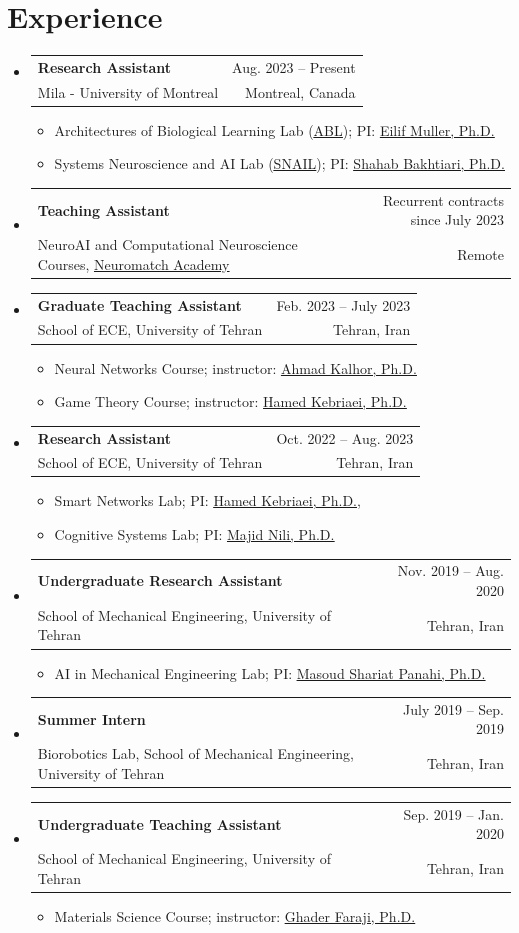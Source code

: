 \documentclass[A4,11pt]{article}
\makeatletter
\newcommand{\CVItem}[1]{
  \item\small{
    {#1 \vspace{-2pt}}
  }
}
\newcommand{\CVSubheading}[4]{
  \vspace{-2pt}\item
    \begin{tabular*}{0.97\textwidth}[t]{l@{\extracolsep{\fill}}r}
      \textbf{#1} & #2 \\
      \small#3 & \small #4 \\
    \end{tabular*}\vspace{-7pt}
}
\newcommand{\CVSubHeadingListStart}{\begin{itemize}[leftmargin=0.5cm, label={}]}
\newcommand{\CVSubHeadingListEnd}{\end{itemize}}
\newcommand{\CVItemListStart}{\begin{itemize}}
\newcommand{\CVItemListEnd}{\end{itemize}\vspace{-5pt}}
\makeatother
\begin{document}
\section{Experience}
  \CVSubHeadingListStart
    \CVSubheading
  {Research Assistant}{Aug. 2023 -- Present}
  {Mila - University of Montreal}{Montreal, Canada}
  \CVItemListStart
   \CVItem{Architectures of Biological Learning Lab (\href{https://neuro.plasticit.ai/}{\underline{ABL}}); PI: \href{https://scholar.google.ch/citations?hl=en&user=r4-NZhwAAAAJ&view_op=list_works&sortby=pubdate}{\underline{Eilif Muller, Ph.D.}}}
  \CVItem{Systems Neuroscience and AI Lab (\href{https://www.snailab.ca/}{\underline{SNAIL}}); PI: \href{https://scholar.google.com/citations?user=f_JDOhEAAAAJ&hl=en}{\underline{Shahab Bakhtiari, Ph.D.}}}
  \CVItemListEnd

  \CVSubheading
      {Teaching Assistant}{Recurrent contracts since July 2023}
      {NeuroAI and Computational Neuroscience Courses, \href{https://academy.neuromatch.io}{\underline{Neuromatch Academy}}}{Remote}
   \CVSubheading
      {Graduate Teaching Assistant}{Feb. 2023 -- July 2023}
      {School of ECE, University of Tehran}{Tehran, Iran}
      \CVItemListStart
        \CVItem{Neural Networks Course; instructor: \href{https://scholar.google.com/citations?user=m7xdmMgAAAAJ&hl=en}{\underline{Ahmad Kalhor, Ph.D.}}}
        \CVItem{Game Theory Course; instructor: \href{https://scholar.google.com/citations?user=eDseLNYAAAAJ&hl=en}{\underline{Hamed Kebriaei, Ph.D.}}}
      \CVItemListEnd
  \CVSubheading
      {Research Assistant}{Oct. 2022 -- Aug. 2023}
      {School of ECE, University of Tehran}{Tehran, Iran}
      \CVItemListStart
        \CVItem{Smart Networks Lab; PI: \href{https://scholar.google.com/citations?user=eDseLNYAAAAJ&hl=en}{\underline{Hamed Kebriaei, Ph.D.}},}
        \CVItem{Cognitive Systems Lab; PI: \href{https://scholar.google.com/citations?user=QlwWxmoAAAAJ&hl=en}{\underline{Majid Nili, Ph.D.}}}
      \CVItemListEnd
    \CVSubheading
      {Undergraduate Research Assistant}{Nov. 2019 -- Aug. 2020}
      {School of Mechanical Engineering, University of Tehran}{Tehran, Iran}
      \CVItemListStart
        \CVItem{AI in Mechanical Engineering Lab; PI: \href{https://scholar.google.com/citations?user=UwlyBw0AAAAJ&hl=en}{\underline{Masoud Shariat Panahi, Ph.D.}}}
      \CVItemListEnd
     \CVSubheading
      {Summer Intern}{July 2019 -- Sep. 2019}
      {Biorobotics Lab, School of Mechanical Engineering, University of Tehran}{Tehran, Iran}
    \CVSubheading
      {Undergraduate Teaching Assistant}{Sep. 2019 -- Jan. 2020}
      {School of Mechanical Engineering, University of Tehran}{Tehran, Iran}
      \CVItemListStart
        \CVItem{Materials Science Course; instructor: \href{https://scholar.google.com/citations?user=C-LGgDwAAAAJ&hl=en}{\underline{Ghader Faraji, Ph.D.}}}
      \CVItemListEnd
  \CVSubHeadingListEnd
\end{document}
